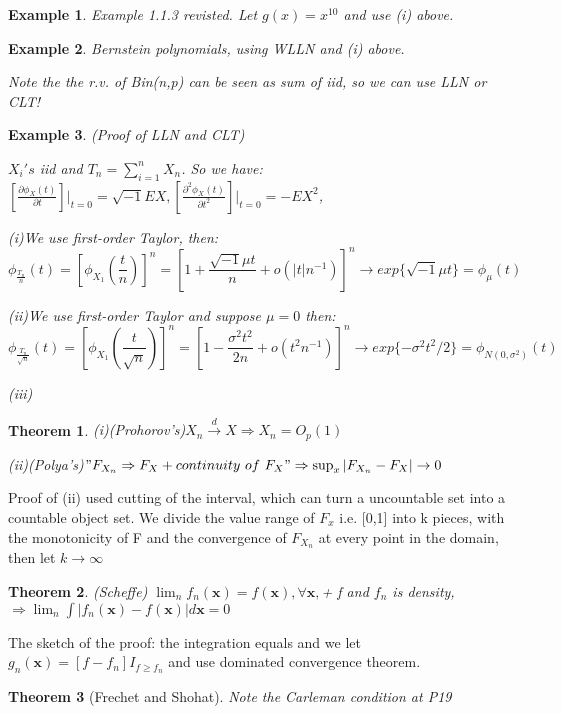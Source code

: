 \documentclass{ctexart}
\newtheorem{theorem}{Theorem}[subsection]
\newtheorem{example}{Example}[subsection]
\begin{document}
\begin{example}
  Example 1.1.3 revisted. Let \(g(x)=x^{10}\) and use (i) above. 
\end{example}
\begin{example}
  Bernstein polynomials, using WLLN and (i) above. 

  Note the the r.v. of Bin(n,p) can be seen as sum of iid, so we can use LLN or CLT!
\end{example}
\begin{example}
  (Proof of LLN and CLT)

  \(X_i's\) iid and \(T_n=\sum_{i=1}^{n} X_n\). So we have: \([\frac{\partial \phi_X(t)}{\partial t}]\Big|_{t=0}=\sqrt{-1}EX,[\frac{\partial^2 \phi_X(t)}{\partial t^2}]\Big|_{t=0}=-EX^2\),

  (i)We use first-order Taylor, then: 
  \[
  \phi_{\frac{T_n}{n}}(t)=[\phi_{X_1}(\frac{t}{n})]^n=[1+\frac{\sqrt{-1}\mu t}{n}+o(|t|n ^{-1})] ^n\to exp\{\sqrt{-1}\mu t\}=\phi_\mu(t)
  \] 
  
  (ii)We use first-order Taylor and suppose $\mu=0$ then: 
  \[
  \phi_{\frac{T_n}{\sqrt{n}}}(t)=[\phi_{X_1}(\frac{t}{\sqrt{n}})]^n=[1-\frac{\sigma^2 t^2}{2n}+o(t^2n ^{-1})] ^n\to exp\{-\sigma^2 t^2/2\}=\phi_{N(0,\sigma^2)}(t)
  \] 

  (iii)

\end{example}
  \begin{theorem}
    (i)(Prohorov's)\(X_n \xrightarrow{d}X\Rightarrow X_n=O_p(1)\)
    
    (ii)(Polya's)\("F_{X_n}\Rightarrow F_X+continuity \ of\ F_X"\Rightarrow \sup_{x}|F_{X_n}-F_X|\to 0\) 
  \end{theorem}
  Proof of (ii) used cutting of the interval, which can turn a uncountable set into a countable object set. We divide the value range of \(F_x\) i.e. [0,1] into k pieces, with the monotonicity of F and the convergence of \(F_{X_n}\) at every point in the domain, then let \(k\to \infty\) 
\begin{theorem}(Scheffe)
  \(\lim_n f_n(\boldsymbol{x})=f(\boldsymbol{x}),\forall \boldsymbol{x},\)+ f and \(f_n\) is density, \(\Rightarrow \lim_n \int |f_n(\boldsymbol{x})-f(\boldsymbol{x})|d \boldsymbol{x}=0\)  
\end{theorem}
The sketch of the proof: the integration equals and we let \(g_n(\boldsymbol{x})=[f-f_n]I_{f\ge f_n}\) and use dominated convergence theorem.     
\begin{theorem}[Frechet and Shohat]
  Note the Carleman condition at P19
\end{theorem}
\end{document}
